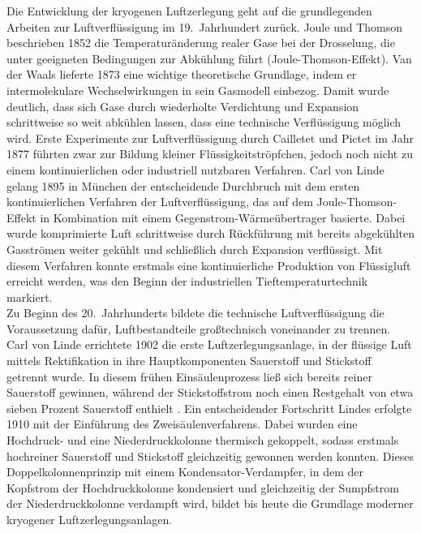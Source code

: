 Die Entwicklung der kryogenen Luftzerlegung geht auf die grundlegenden Arbeiten zur Luftverflüssigung im 19.~Jahrhundert zurück. Joule und Thomson beschrieben 1852 die Temperaturänderung realer Gase bei der Drosselung, die unter geeigneten Bedingungen zur Abkühlung führt (Joule-Thomson-Effekt). Van der Waals lieferte 1873 eine wichtige theoretische Grundlage, indem er intermolekulare Wechselwirkungen in sein Gasmodell einbezog. Damit wurde deutlich, dass sich Gase durch wiederholte Verdichtung und Expansion schrittweise so weit abkühlen lassen, dass eine technische Verflüssigung möglich wird. Erste Experimente zur Luftverflüssigung durch Cailletet und Pictet im Jahr 1877 führten zwar zur Bildung kleiner Flüssigkeitströpfchen, jedoch noch nicht zu einem kontinuierlichen oder industriell nutzbaren Verfahren. Carl von Linde gelang 1895 in München der entscheidende Durchbruch mit dem ersten kontinuierlichen Verfahren der Luftverflüssigung, das auf dem Joule-Thomson-Effekt in Kombination mit einem Gegenstrom-Wärmeübertrager basierte. Dabei wurde komprimierte Luft schrittweise durch Rückführung mit bereits abgekühlten Gasströmen weiter gekühlt und schließlich durch Expansion verflüssigt. Mit diesem Verfahren konnte erstmals eine kontinuierliche Produktion von Flüssigluft erreicht werden, was den Beginn der industriellen Tieftemperaturtechnik markiert. \cite{hausenTieftemperaturtechnik1985, lindeengineeringAirSeparationPlants2019}\\
Zu Beginn des 20.~Jahrhunderts bildete die technische Luftverflüssigung die Voraussetzung dafür, Luftbestandteile großtechnisch voneinander zu trennen. Carl von Linde errichtete 1902 die erste Luftzerlegungsanlage, in der flüssige Luft mittels Rektifikation in ihre Hauptkomponenten Sauerstoff und Stickstoff getrennt wurde. In diesem frühen Einsäulenprozess ließ sich bereits reiner Sauerstoff gewinnen, während der Stickstoffstrom noch einen Restgehalt von etwa sieben Prozent Sauerstoff enthielt \cite{hausenTieftemperaturtechnik1985}. Ein entscheidender Fortschritt Lindes erfolgte 1910 mit der Einführung des Zweisäulenverfahrens. Dabei wurden eine Hochdruck- und eine Niederdruckkolonne thermisch gekoppelt, sodass erstmals hochreiner Sauerstoff und Stickstoff gleichzeitig gewonnen werden konnten. Dieses Doppelkolonnenprinzip mit einem Kondensator-Verdampfer, in dem der Kopfstrom der Hochdruckkolonne kondensiert und gleichzeitig der Sumpfstrom der Niederdruckkolonne verdampft wird, bildet bis heute die Grundlage moderner kryogener Luftzerlegungsanlagen. \cite{hausenTieftemperaturtechnik1985, lindeengineeringAirSeparationPlants2019}\\
